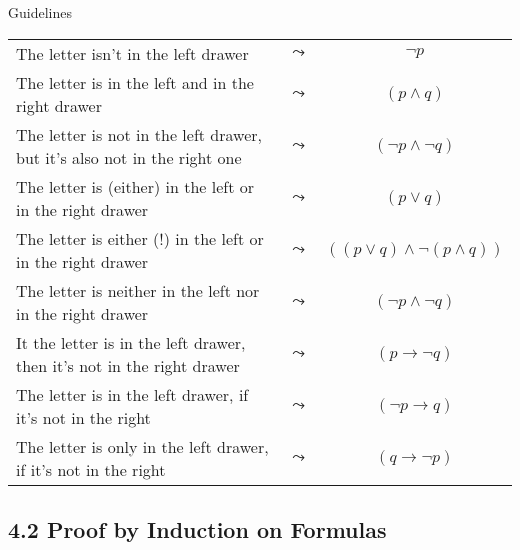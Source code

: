 \documentclass[../slides.tex]{subfiles}
\begin{document}
\begin{frame}{Guidelines}

\begin{tabular}{p{6cm} c c}
	The letter \alert{isn't} in the left drawer & $\leadsto$ & $\neg p$\\[1ex]
	The letter is in the left \alert{and} in the right drawer & $\leadsto$ & $(p\land q)$\\[1ex]
	The letter is not in the left drawer, \alert{but} it's also not in the right one & $\leadsto$ & $(\neg p\land \neg q)$\\[1ex]
	The letter is (\alert{either}) in the left \alert{or} in the right drawer & $\leadsto$ & $(p\lor q)$\\[1ex]
	The letter is \alert{either} (!) in the left \alert{or} in the right drawer & $\leadsto$ & $((p\lor q)\land \neg(p\land q))$\\[1ex]
	The letter is \alert{neither} in the left \alert{nor} in the right drawer  & $\leadsto$ & $(\neg p\land \neg q)$\\[1ex]
	It the letter is in the left drawer, \alert{then} it's not in the right drawer & $\leadsto$ & $(p\to \neg q)$\\[1ex]
	The letter is in the left drawer, \alert{if} it's not in the right & $\leadsto$ & $(\neg p\to q)$\\[1ex]
	The letter is \alert{only} in the left drawer, \alert{if} it's not in the right & $\leadsto$ & $(q\to \neg p)$\\
	\end{tabular}

\end{frame}
		
\subsection{4.2 Proof by Induction on Formulas}
\end{document}
